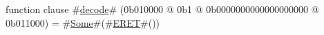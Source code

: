 function clause #\hyperref[zdecode]{decode}# (0b010000 @ 0b1 @ 0b0000000000000000000 @ 0b011000) =
      #\hyperref[zSome]{Some}#(#\hyperref[zERET]{ERET}#())
